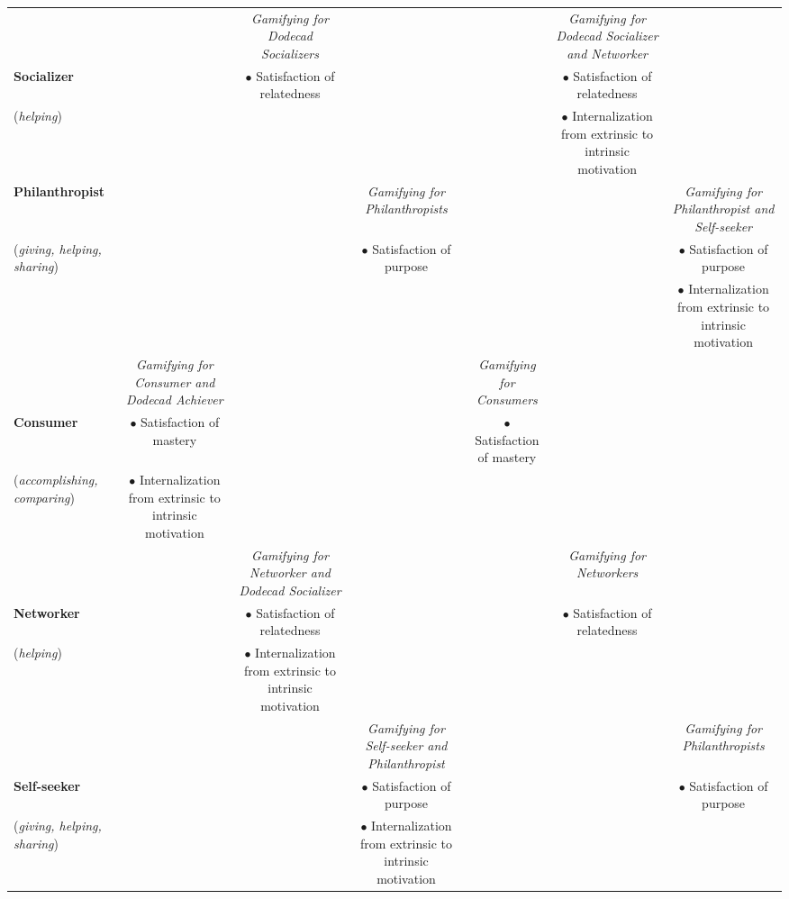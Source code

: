 \begin{landscape}
{\begin{longtable}{|l|c|c|c|c|c|c|}
& &
\multicolumn{1}{p{3cm}|}{\tiny\emph{Gamifying for Dodecad Socializers}}& & &
\multicolumn{1}{p{3cm}|}{\tiny\emph{Gamifying for Dodecad Socializer and Networker}}& \tabularnewline
{\textbf{Socializer}}& &
\multicolumn{1}{p{3cm}|}{\tiny{$\bullet$ Satisfaction of relatedness}}& & &
\multicolumn{1}{p{3cm}|}{\tiny{$\bullet$ Satisfaction of relatedness}}& \tabularnewline
{\tiny(\emph{helping})}& & 
\multicolumn{1}{p{3cm}|}{}& & &
\multicolumn{1}{p{3cm}|}{\tiny{$\bullet$ Internalization from extrinsic to intrinsic motivation}}& \tabularnewline
\hline

\textbf{Philanthropist}& & &
\multicolumn{1}{p{3cm}|}{\tiny\emph{Gamifying for Philanthropists}}& & &
\multicolumn{1}{p{3cm}|}{\tiny\emph{Gamifying for Philanthropist and Self-seeker}}\tabularnewline
{\tiny(\emph{giving, helping, sharing})}& & &
\multicolumn{1}{p{3cm}|}{\tiny{$\bullet$ Satisfaction of purpose}}& & &
\multicolumn{1}{p{3cm}|}{\tiny{$\bullet$ Satisfaction of purpose}}\tabularnewline
& & &
\multicolumn{1}{p{3cm}|}{}& & &
\multicolumn{1}{p{3cm}|}{\tiny{$\bullet$ Internalization from extrinsic to intrinsic motivation}}\tabularnewline
\hline

&
\multicolumn{1}{p{3cm}|}{\tiny\emph{Gamifying for Consumer and Dodecad Achiever}}& & &
\multicolumn{1}{p{3cm}|}{\tiny\emph{Gamifying for Consumers}}& &  \tabularnewline
{\textbf{Consumer}}&
\multicolumn{1}{p{3cm}|}{\tiny{$\bullet$ Satisfaction of mastery}}& & &
\multicolumn{1}{p{3cm}|}{\tiny{$\bullet$ Satisfaction of mastery}}& & \tabularnewline
{\tiny(\emph{accomplishing, comparing})}&
\multicolumn{1}{p{3cm}|}{\tiny{$\bullet$ Internalization from extrinsic to intrinsic motivation}}& & &
\multicolumn{1}{p{3cm}|}{}& & \tabularnewline \newpage
\hline

& &
\multicolumn{1}{p{3cm}|}{\tiny\emph{Gamifying for Networker and Dodecad Socializer}}& & &
\multicolumn{1}{p{3cm}|}{\tiny\emph{Gamifying for Networkers}}&  \tabularnewline
{\textbf{Networker}}& &
\multicolumn{1}{p{3cm}|}{\tiny{$\bullet$ Satisfaction of relatedness}}& & &
\multicolumn{1}{p{3cm}|}{\tiny{$\bullet$ Satisfaction of relatedness}}& \tabularnewline
{\tiny(\emph{helping})}& & 
\multicolumn{1}{p{3cm}|}{\tiny{$\bullet$ Internalization from extrinsic to intrinsic motivation}}& & &
\multicolumn{1}{p{3cm}|}{}& \tabularnewline
\hline

& & &
\multicolumn{1}{p{3cm}|}{\tiny\emph{Gamifying for Self-seeker and Philanthropist}}& & &
\multicolumn{1}{p{3cm}|}{\tiny\emph{Gamifying for Philanthropists}}\tabularnewline
{\textbf{Self-seeker}}& & &
\multicolumn{1}{p{3cm}|}{\tiny{$\bullet$ Satisfaction of purpose}}& & &
\multicolumn{1}{p{3cm}|}{\tiny{$\bullet$ Satisfaction of purpose}}\tabularnewline
{\tiny(\emph{giving, helping, sharing})}& & &
\multicolumn{1}{p{3cm}|}{\tiny{$\bullet$ Internalization from extrinsic to intrinsic motivation}}& & &
\multicolumn{1}{p{3cm}|}{}\tabularnewline
\hline
\end{longtable}
}\end{landscape}

